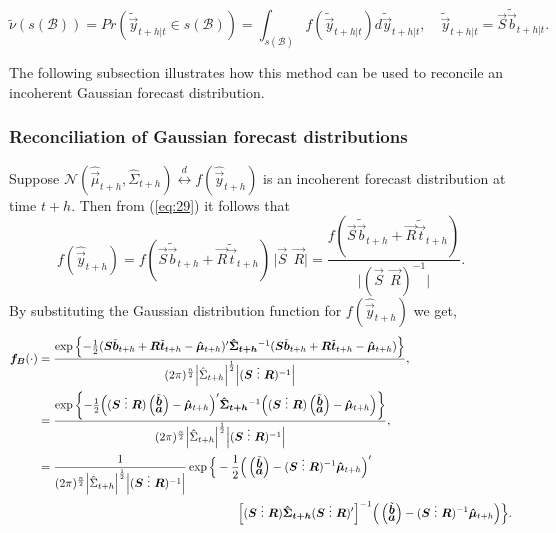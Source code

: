 \documentclass[graybox]{svmult}
\def\ba{\begin{pmatrix}\tilde{\vec{b}}\\[-0.2cm]\tilde{\vec{a}}\end{pmatrix}}
\begin{document}
\begin{equation}\label{eq:33}
\tilde{\nu}(s(\mathcal{B})) = Pr(\tilde{\vec{y}}_{t+h|t} \in s(\mathcal{B}))
= \int_{s(\mathcal{B})}f(\tilde{\vec{y}}_{t+h|t})d\tilde{\vec{y}}_{t+h|t}, \quad \tilde{\vec{y}}_{t+h|t} = \vec{S}\tilde{\vec{b}}_{t+h|t}.
\end{equation}

The following subsection illustrates how this method can be used to reconcile an incoherent Gaussian forecast distribution. 

\subsubsection{Reconciliation of Gaussian forecast distributions}

Suppose $\mathscr{N}(\hat{\vec{\mu}}_{t+h}, \hat{\Sigma}_{t+h}) \overset{d}{\leftrightarrow} f(\hat{\vec{y}}_{t+h})$ is an incoherent forecast distribution at time $t+h$. Then from (\ref{eq:29}) it follows that
\begin{equation*}
f(\hat{\vec{y}}_{t+h})=f(\vec{S}\tilde{\vec{b}}_{t+h}+\vec{R}\tilde{\vec{t}}_{t+h}) \, \Big|\vec{S} ~ ~ \vec{R}\Big| = \frac{f(\vec{S}\tilde{\vec{b}}_{t+h}+\vec{R}\tilde{\vec{t}}_{t+h}) }{\Big|(\vec{S} ~ ~ \vec{R})^{-1}\Big|}.
\end{equation*}
By substituting the Gaussian distribution function for $f(\hat{\vec{y}}_{t+h})$ we get,
\begin{eqnarray}
\vec{f_B}(\cdot)
& =
\frac{\exp\left\{-\frac{1}{2}(\vec{S}\tilde{\vec{b}}_{t+h}+\vec{R}\tilde{\vec{t}}_{t+h}-\vec{\hat{\mu}}_{t+h})' \vec{\hat{\Sigma}_{t+h}}^{-1}(\vec{S}\tilde{\vec{b}}_{t+h}+\vec{R}\tilde{\vec{t}}_{t+h}-\vec{\hat{\mu}}_{t+h})\right\}}{(2\pi)^{\frac{n}{2}}\Big|\hat{\Sigma}_{t+h}\Big|^{\frac{1}{2}}\Big|(\vec{S} ~ \vdots~ \vec{R})^{-1}\Big|},\\
& =
\frac{\exp\left\{-\frac{1}{2}\Big((\vec{S} ~ \vdots~ \vec{R})\ba-\vec{\hat{\mu}}_{t+h}\Big)' \vec{\hat{\Sigma}_{t+h}}^{-1}\Big((\vec{S} ~ \vdots~ \vec{R})\ba-\vec{\hat{\mu}}_{t+h}\Big)\right\}}{(2\pi)^{\frac{n}{2}}\Big|\hat{\Sigma}_{t+h}\Big|^{\frac{1}{2}}\Big|(\vec{S} ~ \vdots~ \vec{R})^{-1}\Big|},\\
& =
\frac{1}{(2\pi)^{\frac{n}{2}}\Big|\hat{\Sigma}_{t+h}\Big|^{\frac{1}{2}}\Big|(\vec{S} ~ \vdots~ \vec{R})^{-1} \Big|}
\exp \Big\{-\frac{1}{2}\Big(\ba-(\vec{S} ~ \vdots~ \vec{R})^{-1}\vec{\hat{\mu}}_{t+h}\Big)'\\
& \hspace*{6cm} \Big[(\vec{S} ~ \vdots~ \vec{R})\vec{\hat{\Sigma}_{t+h}}(\vec{S} ~ \vdots~ \vec{R})'\Big]^{-1}
\Big(\ba-(\vec{S} ~ \vdots~ \vec{R})^{-1}\vec{\hat{\mu}}_{t+h}\Big) \Big\}.
\end{eqnarray}
\end{document}
